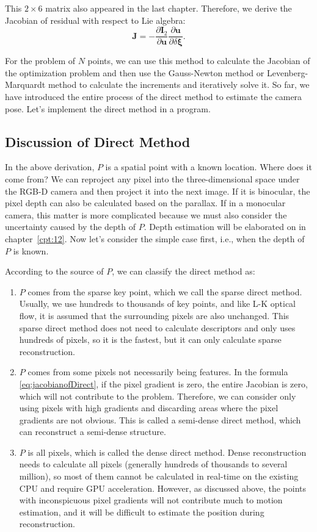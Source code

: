 This $2 \times 6$ matrix also appeared in the last chapter. Therefore, we derive the Jacobian of residual with respect to Lie algebra:
\begin{equation}
\label{eq:jacobianofDirect}
\mathbf{J} =  - \frac{{\partial { \mathbf{I}_2}}}{{\partial \mathbf{u}}}\frac{{\partial \mathbf{u}}}{{\partial \delta \boldsymbol{\xi} }}.
\end{equation}

For the problem of $N$ points, we can use this method to calculate the Jacobian of the optimization problem and then use the Gauss-Newton method or Levenberg-Marquardt method to calculate the increments and iteratively solve it. So far, we have introduced the entire process of the direct method to estimate the camera pose. Let's implement the direct method in a program.

\subsection{Discussion of Direct Method}
In the above derivation, $P$ is a spatial point with a known location. Where does it come from? We can reproject any pixel into the three-dimensional space under the RGB-D camera and then project it into the next image. If it is binocular, the pixel depth can also be calculated based on the parallax. If in a monocular camera, this matter is more complicated because we must also consider the uncertainty caused by the depth of $P$. Depth estimation will be elaborated on in chapter~\ref{cpt:12}. Now let's consider the simple case first, i.e., when the depth of $P$ is known.

According to the source of $P$, we can classify the direct method as:
\begin{enumerate}
	\item $P$ comes from the sparse key point, which we call the sparse direct method. Usually, we use hundreds to thousands of key points, and like L-K optical flow, it is assumed that the surrounding pixels are also unchanged. This sparse direct method does not need to calculate descriptors and only uses hundreds of pixels, so it is the fastest, but it can only calculate sparse reconstruction.
	\item $P$ comes from some pixels not necessarily being features. In the formula \eqref{eq:jacobianofDirect}, if the pixel gradient is zero, the entire Jacobian is zero, which will not contribute to the problem. Therefore, we can consider only using pixels with high gradients and discarding areas where the pixel gradients are not obvious. This is called a semi-dense direct method, which can reconstruct a semi-dense structure.
	\item $P$ is all pixels, which is called the dense direct method. Dense reconstruction needs to calculate all pixels (generally hundreds of thousands to several million), so most of them cannot be calculated in real-time on the existing CPU and require GPU acceleration. However, as discussed above, the points with inconspicuous pixel gradients will not contribute much to motion estimation, and it will be difficult to estimate the position during reconstruction.
\end{enumerate}

